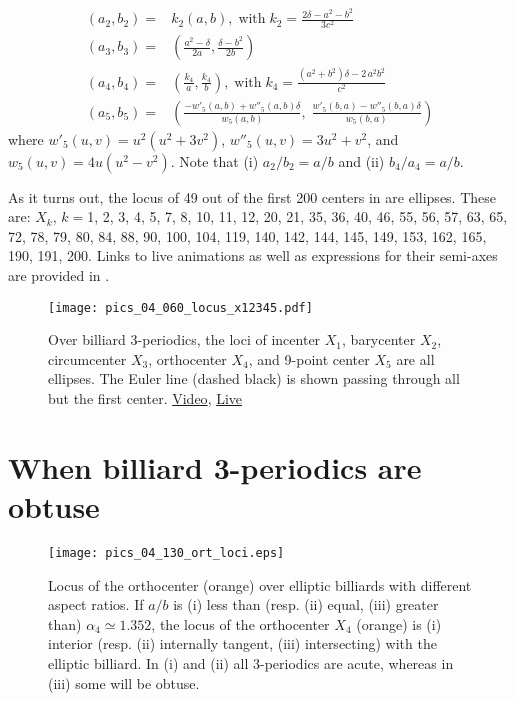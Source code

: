 \begin{align*}
    \left(a_2,b_2\right)=&k_2\left(a,b\right),\;\text{with}\; k_2=\frac{2\delta -a^{2}-b^{2}}{3c^2}\\
     \left(a_3,b_3\right)=&\left(\frac{a^{2}-\delta}{2a},\frac{\delta-b^{2}}{2b}\right)\\
 \left(a_4,b_4\right)=&\left(\frac{k_4}a,\frac{k_4}b\right),\;\text{with}\;k_4=\frac{  (a^{2}+b^{2})\delta-2\,a^{2}b^{2} }{c^2}\\
   \left(a_5,b_5\right)=&\left(\frac{- w'_5(a,b)+ w''_5(a,b) \delta}{ w_5(a,b)},\;\frac{ w'_5(b,a)-{w''_5(b,a) \delta}}{w_5(b,a)}\right)
\end{align*}
where $w'_5(u,v)=u^2(u^2+3v^2)$, $w''_5(u,v)=3u^2+ v^2$, and $w_5(u,v)=4u(u^2-v^2)$. Note that (i) $a_2/b_2=a/b$ and (ii) $b_4/a_4=a/b$.

As it turns out, the locus of 49 out of the first 200 centers in \cite{etc} are ellipses. These are: $X_k$, $k=$1,  2,  3,  4,  5,  7,  8,  10,  11,  12,  20,  21,  35,  36,  40,  46,  55,  56,  57,  63,  65,  72,  78,  79,  80,  84,  88,  90,  100,  104,  119,  140,  142,  144,  145,  149,  153,  162,  165,  190,  191,  200. Links to live animations as well as expressions for their semi-axes are provided in \cite{garcia2021-ellipses-web}.


\begin{figure}
\centering
\texttt{[image: pics\_04\_060\_locus\_x12345.pdf]}
\caption{Over billiard 3-periodics, the loci of incenter $X_1$, barycenter $X_2$, circumcenter $X_3$, orthocenter $X_4$, and 9-point center $X_5$ are all ellipses. The Euler line (dashed black) is shown passing through all but the first center. \href{https://youtu.be/sMcNzcYaqtg}{Video}, \href{https://bit.ly/3eVScgE}{Live}}
\label{fig:04-x12345}
\end{figure}

\section{When billiard 3-periodics are obtuse}

\begin{figure}
    \centering
    \texttt{[image: pics\_04\_130\_ort\_loci.eps]}
    \caption{Locus of the orthocenter (orange) over elliptic billiards with different aspect ratios. If $a/b$ is (i) less than (resp. (ii) equal, (iii) greater than) $\alpha_4{\simeq}1.352$, the locus of the orthocenter $X_4$ (orange) is (i) interior (resp. (ii) internally tangent, (iii) intersecting) with the elliptic billiard. In (i) and (ii) all 3-periodics are acute, whereas in (iii) some will be obtuse.}
    \label{fig:04-orthocenter-loci}
\end{figure}

